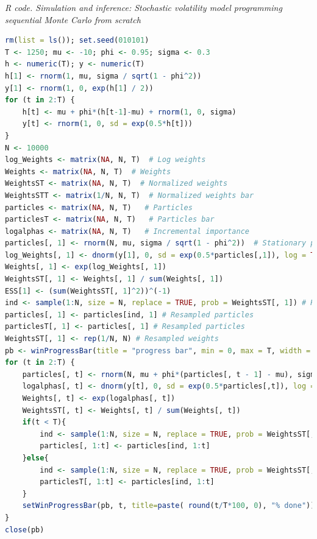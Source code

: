 \begin{tcolorbox}[enhanced,width=4.67in,center upper,
	fontupper=\large\bfseries,drop shadow southwest,sharp corners]
	\textit{R code. Simulation and inference: Stochastic volatility model programming sequential Monte Carlo from scratch}
	\begin{VF}
		\begin{lstlisting}[language=R]
rm(list = ls()); set.seed(010101)
T <- 1250; mu <- -10; phi <- 0.95; sigma <- 0.3
h <- numeric(T); y <- numeric(T)
h[1] <- rnorm(1, mu, sigma / sqrt(1 - phi^2))  
y[1] <- rnorm(1, 0, exp(h[1] / 2))           
for (t in 2:T) {
	h[t] <- mu + phi*(h[t-1]-mu) + rnorm(1, 0, sigma)
	y[t] <- rnorm(1, 0, sd = exp(0.5*h[t]))
}
N <- 10000
log_Weights <- matrix(NA, N, T)  # Log weights
Weights <- matrix(NA, N, T)  # Weights 
WeightsST <- matrix(NA, N, T)  # Normalized weights 
WeightsSTT <- matrix(1/N, N, T)  # Normalized weights bar 
particles <- matrix(NA, N, T)   # Particles
particlesT <- matrix(NA, N, T)   # Particles bar
logalphas <- matrix(NA, N, T)   # Incremental importance 
particles[, 1] <- rnorm(N, mu, sigma / sqrt(1 - phi^2))  # Stationary prior
log_Weights[, 1] <- dnorm(y[1], 0, sd = exp(0.5*particles[,1]), log = TRUE)  # Likelihood
Weights[, 1] <- exp(log_Weights[, 1])
WeightsST[, 1] <- Weights[, 1] / sum(Weights[, 1])
ESS[1] <- (sum(WeightsST[, 1]^2))^(-1)
ind <- sample(1:N, size = N, replace = TRUE, prob = WeightsST[, 1]) # Resample 
particles[, 1] <- particles[ind, 1] # Resampled particles
particlesT[, 1] <- particles[, 1] # Resampled particles
WeightsST[, 1] <- rep(1/N, N) # Resampled weights
pb <- winProgressBar(title = "progress bar", min = 0, max = T, width = 300)
for (t in 2:T) {
	particles[, t] <- rnorm(N, mu + phi*(particles[, t - 1] - mu), sigma)  # Sample from proposal
	logalphas[, t] <- dnorm(y[t], 0, sd = exp(0.5*particles[,t]), log = TRUE) 
	Weights[, t] <- exp(logalphas[, t])
	WeightsST[, t] <- Weights[, t] / sum(Weights[, t])
	if(t < T){
		ind <- sample(1:N, size = N, replace = TRUE, prob = WeightsST[, t])
		particles[, 1:t] <- particles[ind, 1:t]
	}else{
		ind <- sample(1:N, size = N, replace = TRUE, prob = WeightsST[, t])
		particlesT[, 1:t] <- particles[ind, 1:t]
	}
	setWinProgressBar(pb, t, title=paste( round(t/T*100, 0), "% done"))
}
close(pb)
\end{lstlisting}
	\end{VF}
\end{tcolorbox}

